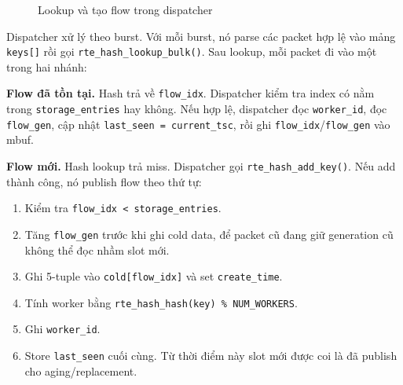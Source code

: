 \documentclass[12pt,a4paper]{report}
\DeclareRobustCommand{\code}[1]{{\small\texttt{#1}}}
\begin{document}
\begin{figure}[H]
\centering
{}
\caption{Lookup và tạo flow trong dispatcher}
\label{fig:flow_lookup_create}
\end{figure}

Dispatcher xử lý theo burst. Với mỗi burst, nó parse các packet hợp lệ vào mảng \code{keys[]} rồi gọi \code{rte\_hash\_lookup\_bulk()}. Sau lookup, mỗi packet đi vào một trong hai nhánh:

\textbf{Flow đã tồn tại.} Hash trả về \code{flow\_idx}. Dispatcher kiểm tra index có nằm trong \code{storage\_entries} hay không. Nếu hợp lệ, dispatcher đọc \code{worker\_id}, đọc \code{flow\_gen}, cập nhật \code{last\_seen = current\_tsc}, rồi ghi \code{flow\_idx}/\code{flow\_gen} vào mbuf.

\textbf{Flow mới.} Hash lookup trả miss. Dispatcher gọi \code{rte\_hash\_add\_key()}. Nếu add thành công, nó publish flow theo thứ tự:

\begin{enumerate}
    \item Kiểm tra \code{flow\_idx < storage\_entries}.
    \item Tăng \code{flow\_gen} trước khi ghi cold data, để packet cũ đang giữ generation cũ không thể đọc nhầm slot mới.
    \item Ghi 5-tuple vào \code{cold[flow\_idx]} và set \code{create\_time}.
    \item Tính worker bằng \code{rte\_hash\_hash(key) \% NUM\_WORKERS}.
    \item Ghi \code{worker\_id}.
    \item Store \code{last\_seen} cuối cùng. Từ thời điểm này slot mới được coi là đã publish cho aging/replacement.
\end{enumerate}
\end{document}
